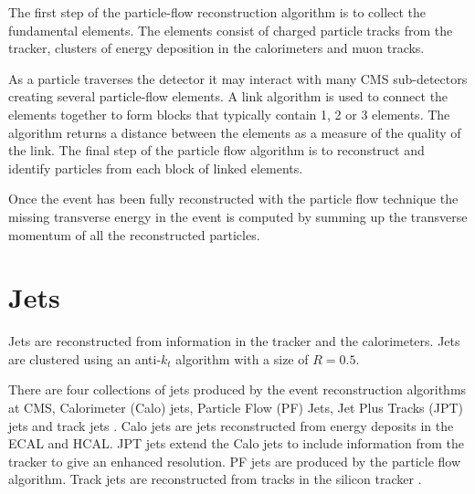 The first step of the particle-flow reconstruction algorithm is to collect the
fundamental elements. The elements consist of charged particle tracks from the
tracker, clusters of energy deposition in the calorimeters and muon tracks.

As a particle traverses the detector it may interact with many CMS sub-detectors
creating several particle-flow elements. A link algorithm is used to connect
the elements together to form blocks that typically contain 1, 2 or 3 elements.
The algorithm returns a distance between the elements as a measure of the
quality of the link. The final step of the particle flow algorithm is to
reconstruct and identify particles from each block of linked elements\cite{PF}.

Once the event has been fully reconstructed with the particle flow technique
the missing transverse energy in the event is computed by
summing up the transverse momentum of all the reconstructed particles\cite{PF}.

\section{Jets}
Jets are reconstructed from information in the tracker and the calorimeters.
Jets are clustered using an anti-$k_t$ algorithm \cite{cacciari2008anti}
with a size of $R=0.5$\cite{collaboration2011determination}.

There are four collections of jets produced by the event reconstruction
algorithms at CMS, Calorimeter (Calo) jets, Particle Flow (PF) Jets, Jet Plus
Tracks (JPT) jets and track jets \cite{collaboration2011determination} . Calo
jets are jets reconstructed from energy deposits in the ECAL and HCAL. JPT jets
extend the Calo jets to include information from the tracker to give an enhanced
\pT resolution. PF jets are produced by the particle flow algorithm\cite{PF}.
Track jets are reconstructed from tracks in the silicon tracker
\cite{collaboration2011determination}.
